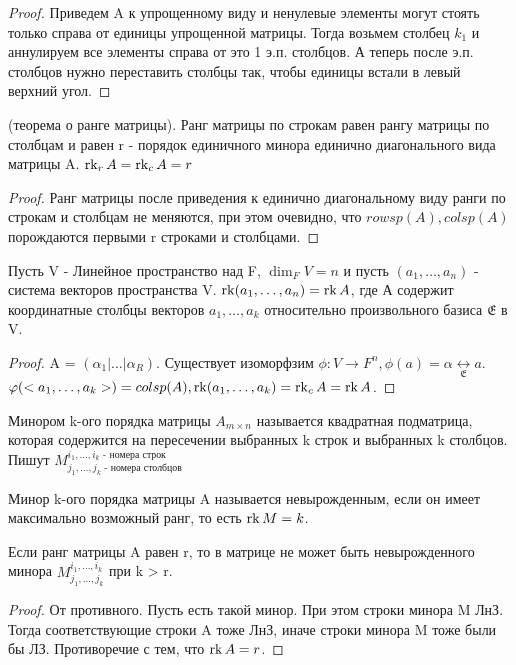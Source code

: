 \begin{proof}
	Приведем A к упрощенному виду и ненулевые элементы могут стоять только справа от единицы упрощенной матрицы. Тогда возьмем столбец \(k_1\) и аннулируем все элементы справа от это 1 э.п. столбцов. А теперь после э.п. столбцов нужно переставить столбцы так, чтобы единицы встали в левый верхний угол.
\end{proof}
\begin{corollary}
	(теорема о ранге матрицы). Ранг матрицы по строкам равен рангу матрицы по столбцам и равен r - порядок единичного минора единично диагонального вида матрицы A. \(\operatorname{rk}_r A= \operatorname{rk}_c A = r\)
\end{corollary}
\begin{proof}
	Ранг матрицы после приведения к единично диагональному виду ранги по строкам и столбцам не меняются, при этом очевидно, что \(rowsp(A), colsp(A)\) порождаются первыми r строками и столбцами.
\end{proof}
\begin{theorem}
	Пусть V - Линейное пространство над F, \(\dim_FV = n\) и пусть \((a_1, \ldots, a_n)\) - система векторов пространства V. \(\operatorname{rk}(a_1, \ldots, a_n) = \operatorname{rk} A\), где А содержит координатные столбцы векторов \(a_1, \ldots, a_k\) относительно произвольного базиса \(\mathfrak{E}\) в V.
\end{theorem}
\begin{proof}
	A = \((\alpha_1 | \ldots | \alpha_R)\). Существует изоморфзим \(\phi: V\to F^n, \phi(a) = \alpha\underset{\mathfrak{E}}{\longleftrightarrow}a\). \(\varphi(<a_1, \ldots, a_k>)=colsp(A), \operatorname{rk}(a_1, \ldots, a_k) = \operatorname{rk}_cA = \operatorname{rk} A\).
\end{proof}
\begin{definition}
	Минором k-ого порядка матрицы \(A_{m\times n}\) называется квадратная подматрица, которая содержится на пересечении выбранных k строк и выбранных k столбцов. Пишут \(M^{i_1, \ldots, i_k\text{ - номера строк}}_{j_1, \ldots, j_k\text{ - номера столбцов}}\)
\end{definition}
\begin{definition}
	Минор k-ого порядка матрицы A называется невырожденным, если он имеет максимально возможный ранг, то есть \(\operatorname{rk} M = k\).
\end{definition}
\begin{note}
	Если ранг матрицы A равен r, то в матрице не может быть невырожденного минора \(M^{i_1, \ldots, i_k}_{j_1, \ldots, j_k}\) при k > r.
\end{note}
\begin{proof}
	От противного. Пусть есть такой минор. При этом строки минора M ЛнЗ. Тогда соответствующие строки A тоже ЛнЗ, иначе строки минора M тоже были бы ЛЗ. Противоречие с тем, что \(\operatorname{rk} A = r\).
\end{proof}
